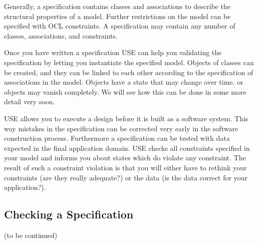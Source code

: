 \documentclass[11pt,a4paper]{article}
\newcommand{\USE}{USE}
\begin{document}
Generally, a specification contains classes and associations to
describe the structural properties of a model. Further restrictions on
the model can be specified with OCL constraints. A specification may
contain any number of classes, associations, and constraints. 

Once you have written a specification \USE{} can help you validating
the specification by letting you instantiate the specified model.
Objects of classes can be created, and they can be linked to each
other according to the specification of associations in the model.
Objects have a state that may change over time, or objects may vanish
completely. We will see how this can be done in some more detail very
soon.

\USE{} allows you to execute a design before it is built as a software
system. This way mistakes in the specification can be corrected very
early in the software construction process. Furthermore a
specification can be tested with data expected in the final
application domain. \USE{} checks all constraints specified in your
model and informs you about states which do violate any constraint.
The result of such a constraint violation is that you will either have
to rethink your constraints (are they really adequate?) or the data
(is the data correct for your application?).

\subsection{Checking a Specification}

(to be continued)


\clearpage
{}



\clearpage
{}
\printindex
\end{document}
